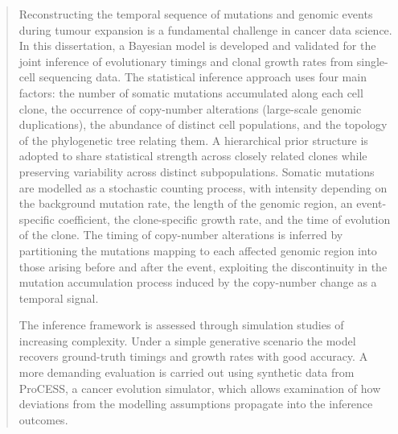 \begin{abstract}
Reconstructing the temporal sequence of mutations and genomic events during tumour expansion is a fundamental challenge in cancer data science. In this dissertation, a Bayesian model is developed and validated for the joint inference of evolutionary timings and clonal growth rates from single-cell sequencing data. The statistical inference approach uses four main factors: the number of somatic mutations accumulated along each cell clone, the occurrence of copy-number alterations (large-scale genomic duplications), the abundance of distinct cell populations, and the topology of the phylogenetic tree relating them. A hierarchical prior structure is adopted to share statistical strength across closely related clones while preserving variability across distinct subpopulations. Somatic mutations are modelled as a stochastic counting process, with intensity depending on the background mutation rate, the length of the genomic region, an event-specific coefficient, the clone-specific growth rate, and the time of evolution of the clone. The timing of copy-number alterations is inferred by partitioning the mutations mapping to each affected genomic region into those arising before and after the event, exploiting the discontinuity in the mutation accumulation process induced by the copy-number change as a temporal signal.

The inference framework is assessed through simulation studies of increasing complexity. Under a simple generative scenario the model recovers ground-truth timings and growth rates with good accuracy. A more demanding evaluation is carried out using synthetic data from ProCESS, a cancer evolution simulator, which allows examination of how deviations from the modelling assumptions propagate into the inference outcomes.

\end{abstract}